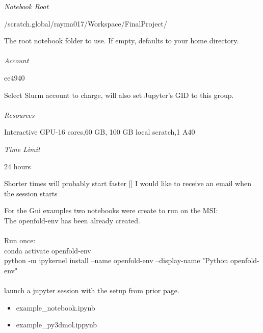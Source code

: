 \documentclass[]{article}
\begin{document}
\emph{Notebook Root}
\begin{tcolorbox}[colback=white,colframe=gray!75!black]{
/scratch.global/rayma017/Workspace/FinalProject/
}
\end{tcolorbox}
The root notebook folder to use. If empty, defaults to your home directory.\\\\
\emph{Account}
\begin{tcolorbox}[colback=white,colframe=gray!75!black]{
ee4940
}
\end{tcolorbox}
Select Slurm account to charge, will also set Jupyter's GID to this group.\\\\
\emph{Resources}
\begin{tcolorbox}[colback=white,colframe=gray!75!black]{
Interactive GPU-16 cores,60 GB, 100 GB local scratch,1 A40
}
\end{tcolorbox}
\emph{Time Limit}
\begin{tcolorbox}[colback=white,colframe=gray!75!black]{
24 hours
}
\end{tcolorbox}
Shorter times will probably start faster
[] I would like to receive an email when the session starts

\newpage
{} 

For the Gui examples two notebooks were create to run on the MSI:\\
The openfold-env has been already created.\\\\

Run once:\\
conda activate openfold-env\\
python -m ipykernel install --name openfold-env --display-name "Python openfold-env"\\\\

launch a jupyter session with the setup from  prior page.\\
		\begin{itemize}{}
			\item{example\_notebook.ipynb}
			\item{example\_py3dmol.ippynb}
		\end{itemize}
\end{document}
